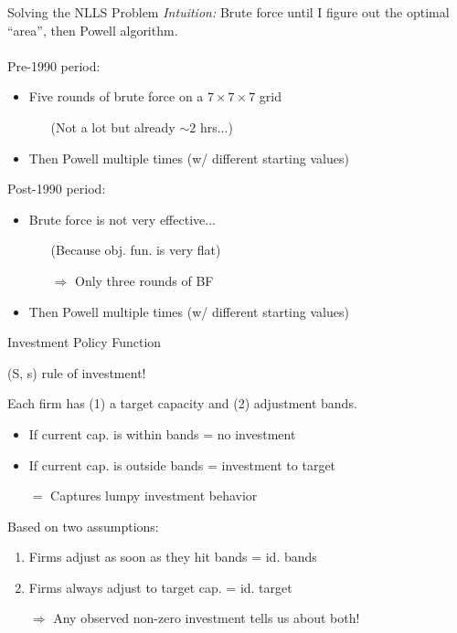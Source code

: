 \documentclass[12pt]{beamer}
\begin{document}
\begin{frame}{Solving the NLLS Problem}
\textit{Intuition:} Brute force until I figure out the optimal ``area'', then Powell algorithm.\\~\\
Pre-1990 period:
\begin{itemize}
\item Five rounds of brute force on a $7\times 7\times 7$ grid
\begin{itemize}
\item[] (Not a lot but already $\sim 2$ hrs...)
\end{itemize}
\item Then Powell multiple times (w/ different starting values)
\item[]
\end{itemize}
Post-1990 period:
\begin{itemize}
\item Brute force is not very effective...
\begin{itemize}
\item[] (Because obj. fun. is very flat)
\item[$\Rightarrow$] Only three rounds of BF
\end{itemize}
\item Then Powell multiple times (w/ different starting values)
\end{itemize}
\end{frame}

\begin{frame}{Investment Policy Function}
\begin{center}
(S, s) rule of investment!
\end{center}
Each firm has (1) a target capacity and (2) adjustment bands.
\begin{itemize}
\item If current cap. is within bands = no investment
\item If current cap. is outside bands = investment to target
\item[$=$] Captures lumpy investment behavior
\item[]
\end{itemize}
Based on two assumptions:
\begin{enumerate}
\item Firms adjust as soon as they hit bands = id. bands
\item Firms always adjust to target cap. = id. target
\item[$\Rightarrow$] Any observed non-zero investment tells us about both!
\end{enumerate}
\end{frame}
\end{document}

